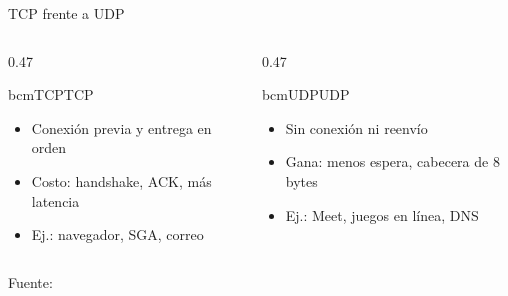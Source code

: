 \begin{frame}{TCP frente a UDP}
  \begin{columns}[T]
    \begin{column}{0.47\textwidth}
      \begin{tarjeta}[equal height group=tcpudp]{bcmTCP}{TCP}
        \begin{itemize}
          \item Conexión previa y entrega en orden
          \item Costo: handshake, ACK, más latencia
          \item Ej.: navegador, SGA, correo
        \end{itemize}
      \end{tarjeta}
    \end{column}
    \begin{column}{0.47\textwidth}
      \begin{tarjeta}[equal height group=tcpudp]{bcmUDP}{UDP}
        \begin{itemize}
          \item Sin conexión ni reenvío
          \item Gana: menos espera, cabecera de 8 bytes
          \item Ej.: Meet, juegos en línea, DNS
        \end{itemize}
      \end{tarjeta}
    \end{column}
  \end{columns}
  \vspace{0.35cm}
  {\small\color{bcmGris}Fuente: \cite[pp.~7--8]{barghash2022}\par}
\end{frame}

